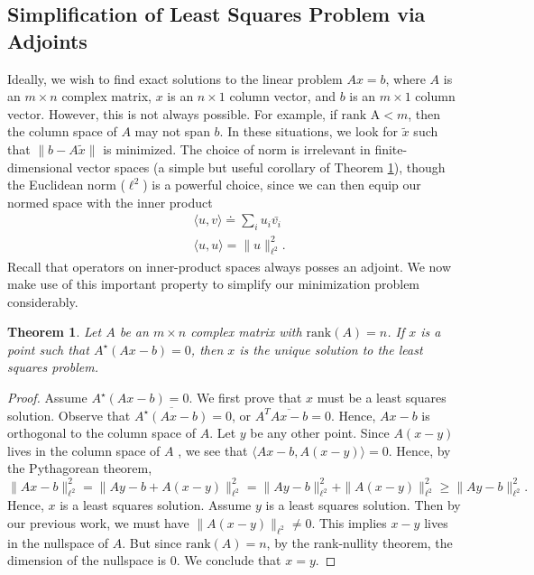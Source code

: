 \documentclass[12pt,reqno]{amsart}
\numberwithin{equation}{section}  %
\newtheorem{theorem}{Theorem}[section]
\begin{document}
\subsection{Simplification of Least Squares Problem via Adjoints} 
Ideally, we wish to find exact solutions to the linear problem $Ax = b$, where
$A$ is an $m \times n$ complex matrix, $x$ is an $n \times 1$ column vector, and
$b$ is an $m \times 1$ column vector. However, this is not always possible. For
example, if $\text{rank A} < m$, then the column space of $A$ may not span $b$.
In these situations, we look for $\tilde{x}$ such that $ \| b - A\tilde{x}\|$ is
minimized. The choice of norm is irrelevant in finite-dimensional vector spaces (a
simple but useful corollary of Theorem \ref{thm:adj-ls}),
though the Euclidean norm ($\ell^2$) is a powerful choice, since we can then
equip our normed space with the inner product
\begin{equation*}
\begin{split}
& \langle u, v \rangle \doteq \sum_i u_i \bar{v_i}
\\
&  \langle u, u \rangle =\| u \|_{\ell^2}^2.
\end{split}
\end{equation*}
Recall that operators on inner-product spaces always posses an adjoint. We now
make use of this important property to simplify our minimization problem
considerably.
\begin{theorem}
\label{thm:adj-ls}
Let $A$ be an $m \times n$ complex matrix with $\text{rank}(A) = n$. 
If $x$ is a point such that $A^{\star} (Ax - b) = 0$, then $x$ is the unique solution 
to the least squares problem.
\end{theorem} 
\begin{proof}
Assume $A^{\star}(Ax-b) = 0$. We first prove that $x$ must be a least squares solution. Observe that
 $\overline{A^{\star}(Ax-b)} = 0$, or $A^T
\overline{Ax-b} = 0$. Hence, $Ax-b$ is orthogonal to the column space of $A$. 
Let $y$ be any other point. Since $A(x-y)$ lives in the column space of $A$
, we see that $\langle Ax-b, A(x-y) \rangle = 0$. Hence, by the Pythagorean theorem,
\begin{equation*}
\| Ax - b \|_{\ell^2}^2 = \| Ay - b + A(x-y)
\|_{\ell^2}^2 = \| Ay - b \|_{\ell^2}^2 + \| A(x-y) \|_{\ell^2}^2 \ge \| Ay - b
\|_{\ell^2}^2.
\end{equation*}
Hence, $x$ is a least squares solution. Assume $y$ is a least squares solution. Then by our previous work, 
we must have $ \| A(x - y) \|_{\ell^2} \neq 0$. This implies $x-y$ lives in the nullspace of $A$.
But since $\text{rank}(A) = n$, by the rank-nullity theorem, the dimension of the nullspace 
is $0$. We conclude that $x = y$. 
\end{proof}
\end{document}
